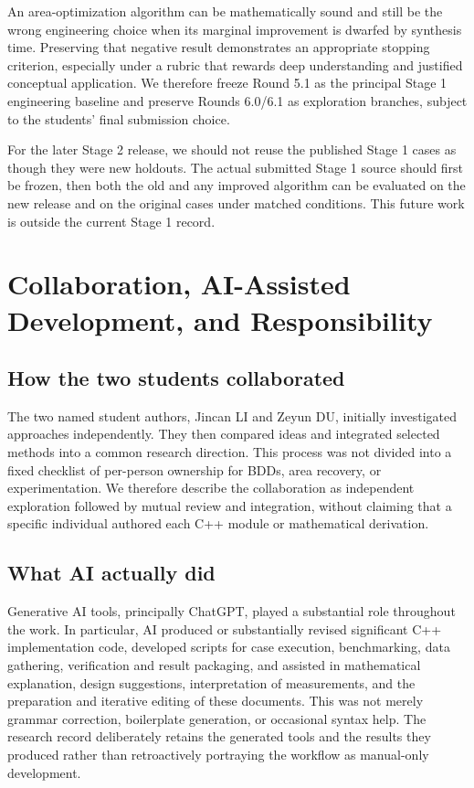 \documentclass[a4paper,10pt]{article}
\theoremstyle{definition}
\theoremstyle{remark}
\begin{document}
An area-optimization algorithm can be mathematically sound and still be the wrong engineering choice when its marginal improvement is dwarfed by synthesis time. Preserving that negative result demonstrates an appropriate stopping criterion, especially under a rubric that rewards deep understanding and justified conceptual application. We therefore freeze Round 5.1 as the principal Stage 1 engineering baseline and preserve Rounds 6.0/6.1 as exploration branches, subject to the students' final submission choice.

For the later Stage 2 release, we should not reuse the published Stage 1 cases as though they were new holdouts. The actual submitted Stage 1 source should first be frozen, then both the old and any improved algorithm can be evaluated on the new release and on the original cases under matched conditions. This future work is outside the current Stage 1 record.


\section{Collaboration, AI-Assisted Development, and Responsibility}
\subsection{How the two students collaborated}
The two named student authors, Jincan LI and Zeyun DU, initially investigated approaches independently. They then compared ideas and integrated selected methods into a common research direction. This process was not divided into a fixed checklist of per-person ownership for BDDs, area recovery, or experimentation. We therefore describe the collaboration as independent exploration followed by mutual review and integration, without claiming that a specific individual authored each C++ module or mathematical derivation.

\subsection{What AI actually did}
Generative AI tools, principally ChatGPT, played a substantial role throughout the work. In particular, AI produced or substantially revised significant C++ implementation code, developed scripts for case execution, benchmarking, data gathering, verification and result packaging, and assisted in mathematical explanation, design suggestions, interpretation of measurements, and the preparation and iterative editing of these documents. This was not merely grammar correction, boilerplate generation, or occasional syntax help. The research record deliberately retains the generated tools and the results they produced rather than retroactively portraying the workflow as manual-only development.
\end{document}
